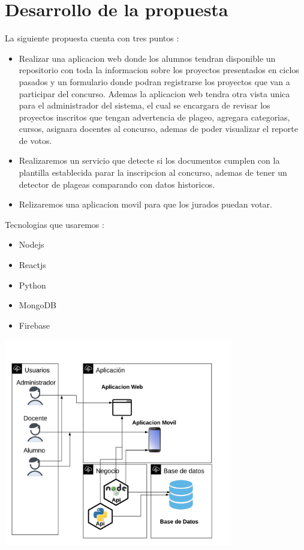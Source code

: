 \documentclass[%
 reprint,
 amsmath,amssymb,
 aps,
]{revtex4-1}
\begin{document}
\section {Desarrollo de la propuesta}
La siguiente propuesta cuenta con tres puntos :
\begin{itemize}
\item Realizar una aplicacion web donde los alumnos tendran disponible un repositorio con toda la informacion sobre los proyectos presentados en ciclos pasados y un formulario donde podran registrarse los proyectos que van a participar del concurso. Ademas la aplicacion web tendra otra vista unica para el administrador del sistema, el cual se encargara de revisar los proyectos inscritos que tengan advertencia de plageo, agregara categorias, cursos, asignara docentes al concurso, ademas de poder visualizar el reporte de votos.  
\item Realizaremos un servicio que detecte si los documentos cumplen con la plantilla establecida parar la inscripcion al concurso, ademas de tener un detector de plageas comparando con datos historicos.
\item Relizaremos una aplicacion movil para que los jurados puedan votar.
\end{itemize}
\newpage
Tecnologias que usaremos :
\begin{itemize}
\item Nodejs
\item Reactjs
\item Python
\item MongoDB
\item Firebase
\end{itemize}
\begin{center}
\includegraphics[width=10cm]{./Imagenes/arquitectura2}
\end{center}
\end{document}
